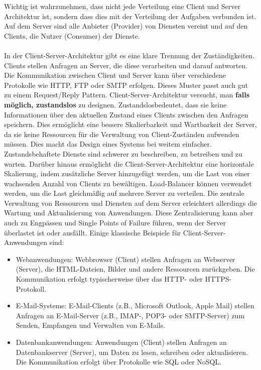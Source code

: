 Wichtig ist wahrzunehmen, dass nicht jede Verteilung eine Client und Server Architektur ist, sondern dass dies mit der Verteilung der Aufgaben verbunden ist. Auf dem Server sind alle Anbieter (Provider) von Diensten vereint und auf den Clients, die Nutzer (Consumer) der Dienste. 
\\\\
In der Client-Server-Architektur gibt es eine klare Trennung der Zuständigkeiten. Clients stellen Anfragen an Server, die diese verarbeiten und darauf antworten. Die Kommunikation zwischen Client und Server kann über verschiedene Protokolle wie HTTP, FTP oder SMTP erfolgen. Dieses Muster passt auch gut zu einem Request/Reply Pattern. 
Client-Server-Architektur versucht, man \textbf{falls möglich, zustandslos} zu designen. Zustandslosbedeutet, dass sie keine Informationen über den aktuellen Zustand eines Clients zwischen den Anfragen speichern. Dies ermöglicht eine bessere Skalierbarkeit und Wartbarkeit der Server, da sie keine Ressourcen für die Verwaltung von Client-Zuständen aufwenden müssen. Dies macht das Design eines Systems bei weitem einfacher. Zustandsbehaftete Dienste sind schwerer zu beschreiben, zu betreiben und zu warten. 
Darüber hinaus ermöglicht die Client-Server-Architektur eine horizontale Skalierung, indem zusätzliche Server hinzugefügt werden, um die Last von einer wachsenden Anzahl von Clients zu bewältigen. Load-Balancer können verwendet werden, um die Last gleichmäßig auf mehrere Server zu verteilen.
Die zentrale Verwaltung von Ressourcen und Diensten auf dem Server erleichtert allerdings die Wartung und Aktualisierung von Anwendungen. Diese Zentralisierung kann aber auch zu Engpässen und Single Points of Failure führen, wenn der Server überlastet ist oder ausfällt. Einige klassische Beispiele für Client-Server-Anwendungen sind:
\begin{itemize}
\item Webanwendungen: Webbrowser (Client) stellen Anfragen an Webserver (Server), die HTML-Dateien, Bilder und andere Ressourcen zurückgeben. Die Kommunikation erfolgt typischerweise über das HTTP- oder HTTPS-Protokoll.
\item E-Mail-Systeme: E-Mail-Clients (z.B., Microsoft Outlook, Apple Mail) stellen Anfragen an E-Mail-Server (z.B., IMAP-, POP3- oder SMTP-Server) zum Senden, Empfangen und Verwalten von E-Mails.
\item Datenbankanwendungen: Anwendungen (Client) stellen Anfragen an Datenbankserver (Server), um Daten zu lesen, schreiben oder aktualisieren. Die Kommunikation erfolgt über Protokolle wie SQL oder NoSQL.
\end{itemize}
